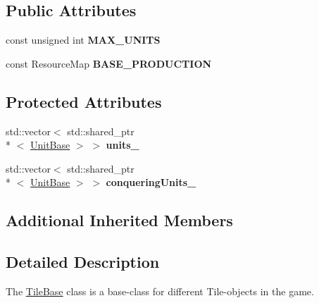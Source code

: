 \subsection*{Public Attributes}
\begin{DoxyCompactItemize}
\item 
\hypertarget{class_course_1_1_tile_base_affd265454d72fcedea5a04b45ac3c7b0}{const unsigned int {\bfseries M\-A\-X\-\_\-\-U\-N\-I\-T\-S}}\label{class_course_1_1_tile_base_affd265454d72fcedea5a04b45ac3c7b0}

\item 
\hypertarget{class_course_1_1_tile_base_a62cd84d3705c6cca9afd0cb992dd4f02}{const Resource\-Map {\bfseries B\-A\-S\-E\-\_\-\-P\-R\-O\-D\-U\-C\-T\-I\-O\-N}}\label{class_course_1_1_tile_base_a62cd84d3705c6cca9afd0cb992dd4f02}

\end{DoxyCompactItemize}
\subsection*{Protected Attributes}
\begin{DoxyCompactItemize}
\item 
\hypertarget{class_course_1_1_tile_base_a3e5fda0cad76e6f64ac8bbb68891a5cd}{std\-::vector$<$ std\-::shared\-\_\-ptr\\*
$<$ \hyperlink{class_course_1_1_unit_base}{Unit\-Base} $>$ $>$ {\bfseries units\-\_\-}}\label{class_course_1_1_tile_base_a3e5fda0cad76e6f64ac8bbb68891a5cd}

\item 
\hypertarget{class_course_1_1_tile_base_a55461fa75fbd09b7fd0596ba3f61d915}{std\-::vector$<$ std\-::shared\-\_\-ptr\\*
$<$ \hyperlink{class_course_1_1_unit_base}{Unit\-Base} $>$ $>$ {\bfseries conquering\-Units\-\_\-}}\label{class_course_1_1_tile_base_a55461fa75fbd09b7fd0596ba3f61d915}

\end{DoxyCompactItemize}
\subsection*{Additional Inherited Members}


\subsection{Detailed Description}
The \hyperlink{class_course_1_1_tile_base}{Tile\-Base} class is a base-\/class for different Tile-\/objects in the game. 

